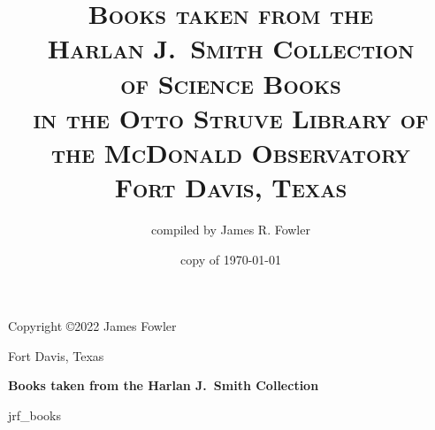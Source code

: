 \documentclass[letterpaper]{book}
\begin{document}
\frontmatter
\pagestyle{empty}
\title{\textsc{Books taken from the \\
    Harlan J.\ Smith Collection \\
    of Science Books \\
    in the Otto Struve Library of \\
    the McDonald Observatory \\
    Fort Davis, Texas}}
\author{compiled by James R. Fowler}
\date{copy of \today}
\maketitle
\newpage
\vspace*{5 in}
\centerline{Copyright \copyright 2022 James Fowler}
\centerline{Fort Davis, Texas}
\newpage

\mainmatter
\begin{center}
  {\Large \bf Books taken from the Harlan J.\ Smith Collection}
\end{center}
\bigskip
{jrf_books}
\end{document}
